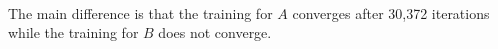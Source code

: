 \begin{answer}\\
The main difference is that the training for $A$ converges after 30,372 iterations while the training for $B$ does not converge.
\end{answer}
